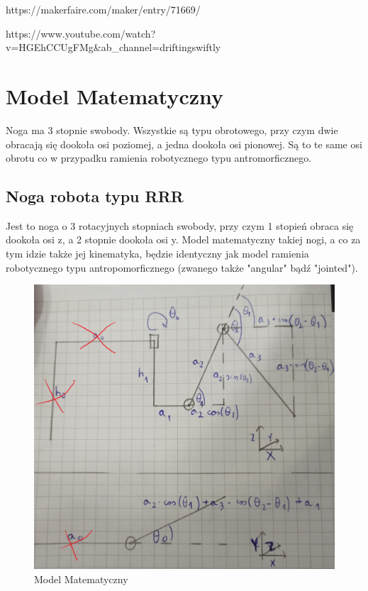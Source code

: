 \documentclass[a4paper,13pt]{article}
\begin{document}
https://makerfaire.com/maker/entry/71669/

https://www.youtube.com/watch?v=HGEhCCUgFMg&ab_channel=driftingswiftly




\section{Model Matematyczny}
Noga ma 3 stopnie swobody. Wszystkie są typu obrotowego, przy czym dwie obracają się dookoła osi poziomej, a jedna dookoła osi pionowej. Są to te same osi obrotu co w przypadku ramienia robotycznego typu antromorficznego.
\subsection{Noga robota typu RRR}
Jest to noga o 3 rotacyjnych stopniach swobody, przy czym 1 stopień obraca się dookoła osi z, a 2 stopnie dookoła osi y. Model matematyczny takiej nogi, a co za tym idzie także jej kinematyka, będzie identyczny jak model ramienia robotycznego typu antropomorficznego (zwanego także "angular" bądź "jointed").

\begin{figure}[H]
\includegraphics[width=\textwidth]{img/math_model.jpg}
\caption{Model Matematyczny}
\label{math_model}
\end{figure}
\end{document}
